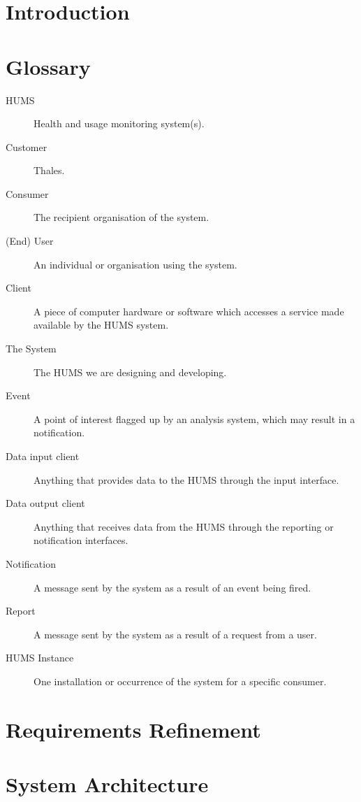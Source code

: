 \documentclass[10pt,a4paper]{article}
\begin{document}


\section{Introduction}

\section{Glossary}

\begin{description}
	\item[HUMS] Health and usage monitoring system(s).
	\item[Customer] Thales. 
	\item[Consumer] The recipient organisation of the system.
	\item[(End) User] An individual or organisation using the system.
	\item[Client] A piece of computer hardware or software which accesses a
	              service made available by the HUMS system.
	\item[The System] The HUMS we are designing and developing.
	\item[Event] A point of interest flagged up by an analysis system, which
	             may result in a notification.
	\item[Data input client] Anything that provides data to the HUMS through
	                         the input interface.
	\item[Data output client] Anything that receives data from the HUMS
	                          through the reporting or notification interfaces.
	\item[Notification] A message sent by the system as a result of an event
	                    being fired.
	\item[Report] A message sent by the system as a result of a request from 				a user. 
	\item[HUMS Instance] One installation or occurrence of the system for a
	                     specific consumer.
\end{description}

\section{Requirements Refinement}

\section{System Architecture}
\end{document}
